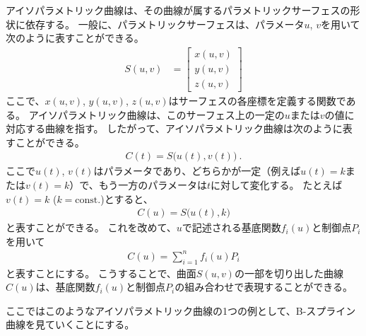 


アイソパラメトリック曲線は、その曲線が属するパラメトリックサーフェスの形状に依存する。
一般に、パラメトリックサーフェスは、パラメータ$u$, $v$を用いて次のように表すことができる。
\begin{align*}
  S(u, v) &=
  \left[
  \begin{array}{c}
    x(u, v)\\
    y(u, v)\\
    z(u, v)
  \end{array}
  \right]
\end{align*}
ここで、$x(u,v)$, $y(u,v)$, $z(u,v)$はサーフェスの各座標を定義する関数である。
アイソパラメトリック曲線は、このサーフェス上の一定の$u$または$v$の値に対応する曲線を指す。
したがって、アイソパラメトリック曲線は次のように表すことができる。
\begin{align*}
  C(t) = S\big(u(t), v(t)\big)\ .
\end{align*}
ここで$u(t)$, $v(t)$はパラメータであり、どちらかが一定（例えば$u(t)=k$または$v(t)=k$）で、もう一方のパラメータは$t$に対して変化する。
たとえば$v(t) = k$ ($k = \text{const.}$)とすると、
\begin{align*}
  C(u) = S\big(u(t), k\big)
\end{align*}
と表すことができる。
これを改めて、$u$で記述される基底関数$f_i(u)$と制御点$P_i$を用いて
\begin{align*}
  C(u) = \sum_{i=1}^nf_i(u)P_i
\end{align*}
と表すことにする。
こうすることで、曲面$S(u, v)$の一部を切り出した曲線$C(u)$は、基底関数$f_i(u)$と制御点$P_i$の組み合わせで表現することができる。

ここではこのようなアイソパラメトリック曲線の1つの例として、B-スプライン曲線を見ていくことにする。



